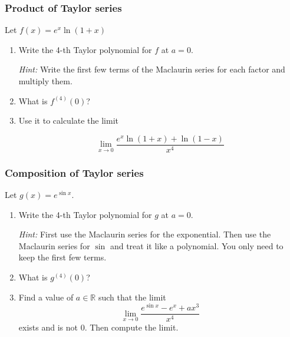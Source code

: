 \begin{frame}[t]
	\frametitle{Product of Taylor series}

	Let $\displaystyle f(x) = e^{x}\ln(1+x)$
	\vspace{.2cm}

	\begin{enumerate}
		\item Write the 4-th Taylor polynomial for $f$ at $a=0$.
			\vspace{.2cm}

			{\fontsize{11}{11}\selectfont \emph{Hint:} Write the first few terms of the Maclaurin series for each factor and multiply them. }
			\vspace{.5cm}

		\item What is $\displaystyle f^{(4)}(0)$?
			\vspace{.5cm}


		\item Use it to calculate the limit

			\[
				\lim_{x \to 0}\frac{e^{x}\ln(1+x) + \ln(1-x)}{x^{4}}
			\]
	\end{enumerate}
\end{frame}

\begin{frame}[t]
	\fontsize{13}{13}\selectfont
	\frametitle{Composition of Taylor series}

	Let $\displaystyle g(x) = e^{\sin x}$.
	\vspace{.2cm}

	\begin{enumerate}
		\item Write the 4-th Taylor polynomial for $g$ at $a=0$.
			\vspace{.2cm}

			{\fontsize{11}{11}\selectfont \emph{Hint:} First use the Maclaurin series for the exponential. Then use the Maclaurin series for $\sin$ and treat it like a polynomial. You only need to keep the first few terms. }
			\vspace{.2cm}


		\item What is $\displaystyle g^{(4)}(0)$?
			\vspace{.2cm}


		\item Find a value of $a \in \mathbb{R}$ such that the limit
			\[
				\lim_{x \to 0}\frac{e^{\sin x}- e^{x}+ ax^{3}}{x^{4}}
			\]
			exists and is not 0. Then compute the limit.
	\end{enumerate}
\end{frame}

